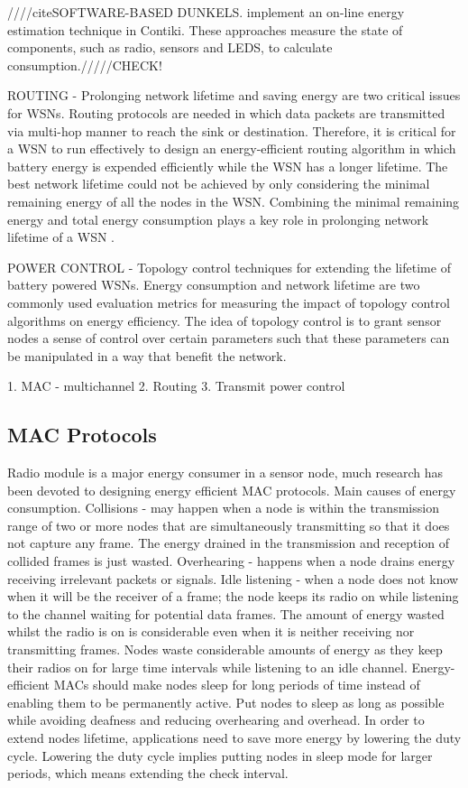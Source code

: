 ////citeSOFTWARE-BASED DUNKELS. implement an on-line energy estimation technique in Contiki. These approaches measure the state of components, such as radio, sensors and LEDS, to calculate consumption./////CHECK!

ROUTING - Prolonging network lifetime and saving energy are two critical issues for WSNs. Routing protocols are needed in which data packets are transmitted via multi-hop manner to reach the sink or destination. Therefore, it is critical for a WSN to run effectively to design an energy-efficient routing algorithm in which battery energy is expended efficiently while the WSN has a longer lifetime. The best network lifetime could not be achieved by only considering the minimal remaining energy of all the nodes in the WSN. Combining the minimal remaining energy and total energy consumption plays a key role in prolonging network lifetime of a WSN \cite{erapl}.

POWER CONTROL - Topology control techniques for extending the lifetime of battery powered WSNs. Energy consumption and network lifetime are two commonly used evaluation metrics for measuring the impact of topology control algorithms on energy efficiency. The idea of topology control is to grant sensor nodes a sense of control over certain parameters such that these parameters can be manipulated in a way that benefit the network. \cite{azrinasurvey}

1. MAC - multichannel
2. Routing
3. Transmit power control

\subsection{MAC Protocols}
Radio module is a major energy consumer in a sensor node, much research has been devoted to designing energy efficient MAC protocols.
Main causes of energy consumption. Collisions - may happen when a node is within the transmission range of two or more nodes that are simultaneously transmitting so that it does not capture any frame. The energy drained in the transmission and reception of collided frames is just wasted. Overhearing - happens when a node drains energy receiving irrelevant packets or signals. Idle listening - when a node does not know when it will be the receiver of a frame; the node keeps its radio on while listening to the channel waiting for potential data frames. The amount of energy wasted whilst the radio is on is considerable even when it is neither receiving nor transmitting frames. Nodes waste considerable amounts of energy as they keep their radios on for large time intervals while listening to an idle channel. Energy-efficient MACs should make nodes sleep for long periods of time instead of enabling them to be permanently active. Put nodes to sleep as long as possible while avoiding deafness and reducing overhearing and overhead. In order to extend nodes lifetime, applications need to save more energy by lowering the duty cycle. Lowering the duty cycle implies putting nodes in sleep mode for larger periods, which means extending the check interval. \cite{macsurvey}

